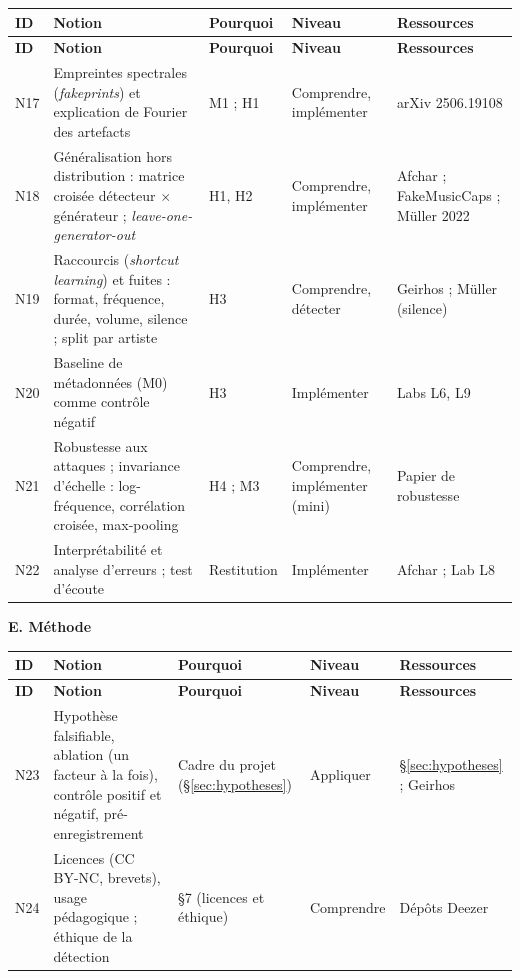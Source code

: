 \documentclass[11pt,a4paper]{article}
\begin{document}
{\small
\begin{longtable}{L{0.9cm}L{3.7cm}L{4.6cm}L{2.3cm}L{3.1cm}}
\toprule
\textbf{ID} & \textbf{Notion} & \textbf{Pourquoi} & \textbf{Niveau} & \textbf{Ressources}\\
\midrule
\endfirsthead
\toprule
\textbf{ID} & \textbf{Notion} & \textbf{Pourquoi} & \textbf{Niveau} & \textbf{Ressources}\\
\midrule
\endhead
\bottomrule
\endfoot
N17 & Empreintes spectrales (\emph{fakeprints}) et explication de Fourier des artefacts & M1 ; H1 & Comprendre, implémenter & arXiv 2506.19108\\
N18 & Généralisation hors distribution : matrice croisée détecteur $\times$ générateur ; \emph{leave-one-generator-out} & H1, H2 & Comprendre, implémenter & Afchar ; FakeMusicCaps ; Müller 2022\\
N19 & Raccourcis (\emph{shortcut learning}) et fuites : format, fréquence, durée, volume, silence ; split par artiste & H3 & Comprendre, détecter & Geirhos ; Müller (silence)\\
N20 & Baseline de métadonnées (M0) comme contrôle négatif & H3 & Implémenter & Labs L6, L9\\
N21 & Robustesse aux attaques ; invariance d'échelle : log-fréquence, corrélation croisée, max-pooling & H4 ; M3 & Comprendre, implémenter (mini) & Papier de robustesse\\
N22 & Interprétabilité et analyse d'erreurs ; test d'écoute & Restitution & Implémenter & Afchar ; Lab L8\\
\end{longtable}
}

\textbf{E. Méthode}

{\small
\begin{longtable}{L{0.9cm}L{3.7cm}L{4.6cm}L{2.3cm}L{3.1cm}}
\toprule
\textbf{ID} & \textbf{Notion} & \textbf{Pourquoi} & \textbf{Niveau} & \textbf{Ressources}\\
\midrule
\endfirsthead
\toprule
\textbf{ID} & \textbf{Notion} & \textbf{Pourquoi} & \textbf{Niveau} & \textbf{Ressources}\\
\midrule
\endhead
\bottomrule
\endfoot
N23 & Hypothèse falsifiable, ablation (un facteur à la fois), contrôle positif et négatif, pré-enregistrement & Cadre du projet (\S\ref{sec:hypotheses}) & Appliquer & \S\ref{sec:hypotheses} ; Geirhos\\
N24 & Licences (CC BY-NC, brevets), usage pédagogique ; éthique de la détection & \S7 (licences et éthique) & Comprendre & Dépôts Deezer\\
\end{longtable}
}
\end{document}
